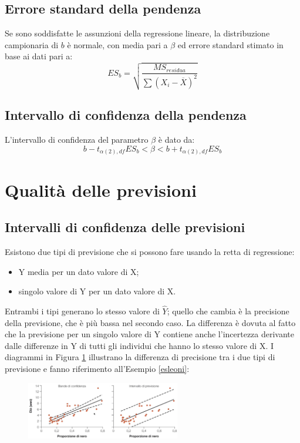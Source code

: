\documentclass[10pt, draft]{book}
\newcommand{\tightlist}{%
\setlength{\itemsep}{1pt}\setlength{\parskip}{0pt}\setlength{\parsep}{0pt}}
\begin{document}
\subsection{Errore standard della pendenza}

Se sono soddisfatte le assunzioni della regressione lineare, la distribuzione campionaria di $b$ è normale, con media pari a $\beta$ ed errore standard stimato in base ai dati pari a:
\begin{equation}
    ES_b = \sqrt{\frac{MS_{residua}}{\sum{(X_i-\overline{X})^2}}}
\end{equation}

\subsection{Intervallo di confidenza della pendenza}

L'intervallo di confidenza del parametro $\beta$ è dato da:
\begin{equation}
    b-t_{\alpha(2),df}ES_b<\beta<b+t_{\alpha(2),df}ES_b
\end{equation}

\section{Qualità delle previsioni}

\subsection{Intervalli di confidenza delle previsioni}

Esistono due tipi di previsione che si possono fare usando la retta di regressione:
\begin{itemize}\tightlist
    \item Y media per un dato valore di X;
    \item singolo valore di Y per un dato valore di X.
\end{itemize}
Entrambi i tipi generano lo stesso valore di $\hat{Y}$; quello che cambia è la precisione della previsione, che è più bassa nel secondo caso. La differenza è dovuta al fatto che la previsione per un singolo valore di Y contiene anche l'incertezza derivante dalle differenze in Y di tutti gli individui che hanno lo stesso valore di X. I diagrammi in Figura \ref{fig17.2-1} illustrano la differenza di precisione tra i due tipi di previsione e fanno riferimento all'Esempio \ref{esleoni}:\\
\begin{figure}[H]
    \centering
    \includegraphics[width=0.6\textwidth]{fig17.2-1}
    \caption{\small{}}
    \label{fig17.2-1}
\end{figure}
\end{document}
